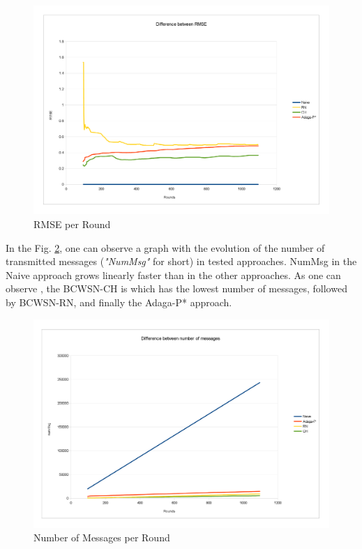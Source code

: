\documentclass[conference]{IEEEtran}
\begin{document}
\begin{figure}[!htb]
\centering
	\includegraphics[scale=0.085]{graf_RMSE_.png}
    \caption{RMSE per Round}
    \label{fig:rmse}
\end{figure}

In the Fig. \ref{fig:num-msg}, one can observe a graph with the evolution of the
number of transmitted messages ({\it "NumMsg"} for short) in tested approaches.
NumMsg in the Naive approach grows linearly faster than in the other approaches.
As one can observe 
, the BCWSN-CH is
which has the lowest number of messages, followed by BCWSN-RN, and finally the
Adaga-P* approach.

\begin{figure}[!htb]
\centering
	\includegraphics[scale=0.085]{graf_numMsg_.png}
    \caption{Number of Messages per Round}
    \label{fig:num-msg}
\end{figure}
\end{document}
